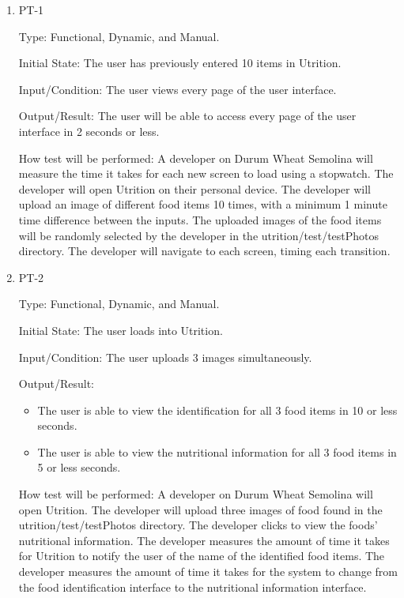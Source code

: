 \documentclass[12pt, titlepage]{article}
\begin{document}
	\begin{enumerate}
		
		\item{PT-1} 
		
		Type: Functional, Dynamic, and Manual.
		
		Initial State: The user has previously entered 10 items in Utrition.
		
		Input/Condition: The user views every page of the user interface.
		
		Output/Result: The user will be able to access every page of the user interface in 2 seconds or less.
		
		How test will be performed: A developer on Durum Wheat Semolina will measure the time it takes for each new screen to load using a stopwatch. The developer will open Utrition on their personal device. The developer will upload an image of different food items 10 times, with a minimum 1 minute time difference between the inputs. The uploaded images of the food items will be randomly selected by the developer in the utrition/test/testPhotos directory. The developer will navigate to each screen, timing each transition.
		
		\item{PT-2} 
		
		Type: Functional, Dynamic, and Manual.
		
		Initial State: The user loads into Utrition.
		
		Input/Condition: The user uploads 3 images simultaneously.
		
		Output/Result: 
		\begin{itemize}
			\item The user is able to view the identification for all 3 food items in 10 or less seconds.
			\item The user is able to view the nutritional information for all 3 food items in 5 or less seconds.
		\end{itemize}
		
		How test will be performed: A developer on Durum Wheat Semolina will 
		open Utrition. The developer 
		will upload three images of food found in the utrition/test/testPhotos 
		directory. The developer clicks to view 
		the foods’ nutritional information. The developer measures the amount 
		of time it takes for Utrition to notify the user of the name of the 
		identified food items. The developer measures the amount of time it 
		takes for the system to change from the food identification interface 
		to the nutritional information interface.
		

\end{enumerate}
\end{document}
